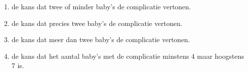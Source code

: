 
\begin{enumerate}[label=(\alph*)]
    \item de kans dat twee of minder baby's de complicatie vertonen.
    \answer{

    }

    \item de kans dat precies twee baby's de complicatie vertonen.
    \answer{

    }

    \item de kans dat meer dan twee baby's de complicatie vertonen.
    \answer{

    }

    \item de kans dat het aantal baby's met de complicatie minstens 4 maar hoogstens 7 is.
    \answer{
        
    }
\end{enumerate}